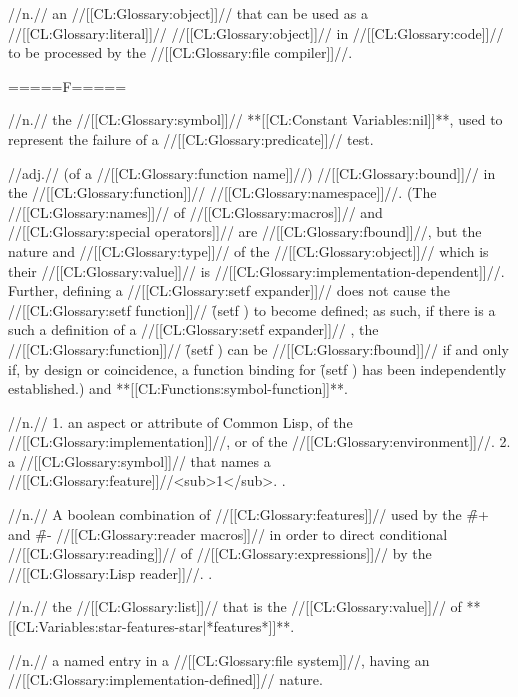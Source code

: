  //n.// an //[[CL:Glossary:object]]// that can be used as a //[[CL:Glossary:literal]]// //[[CL:Glossary:object]]// in //[[CL:Glossary:code]]// to be processed by the //[[CL:Glossary:file compiler]]//. 

=====F=====
 
 //n.// the //[[CL:Glossary:symbol]]// **[[CL:Constant Variables:nil]]**, used to represent the failure of a //[[CL:Glossary:predicate]]// test.

 //adj.// (of a //[[CL:Glossary:function name]]//) //[[CL:Glossary:bound]]// in the //[[CL:Glossary:function]]// //[[CL:Glossary:namespace]]//. (The //[[CL:Glossary:names]]// of //[[CL:Glossary:macros]]// and //[[CL:Glossary:special operators]]// are //[[CL:Glossary:fbound]]//, but the nature and //[[CL:Glossary:type]]// of the //[[CL:Glossary:object]]// which is their //[[CL:Glossary:value]]// is //[[CL:Glossary:implementation-dependent]]//.
 Further, defining a //[[CL:Glossary:setf expander]]//  does not cause the //[[CL:Glossary:setf function]]// \f{(setf )} to become defined; as such, if there is a such a definition of a //[[CL:Glossary:setf expander]]// , the //[[CL:Glossary:function]]// \f{(setf )} can be //[[CL:Glossary:fbound]]// if and only if, by design or coincidence, a function binding for \f{(setf )} has been independently established.)  and **[[CL:Functions:symbol-function]]**.

 //n.// 1. an aspect or attribute of Common Lisp, of the //[[CL:Glossary:implementation]]//, or of the //[[CL:Glossary:environment]]//. 2. a //[[CL:Glossary:symbol]]// that names a //[[CL:Glossary:feature]]//<sub>1</sub>. \Seesection\Features. 

 //n.// A boolean combination of //[[CL:Glossary:features]]// used by the \f{\#+} and \f{\#-} //[[CL:Glossary:reader macros]]// in order to direct conditional //[[CL:Glossary:reading]]// of //[[CL:Glossary:expressions]]// by the //[[CL:Glossary:Lisp reader]]//. \Seesection\FeatureExpressions.

 //n.// the //[[CL:Glossary:list]]// that is the //[[CL:Glossary:value]]// of **[[CL:Variables:star-features-star|*features*]]**.

 //n.// a named entry in a //[[CL:Glossary:file system]]//, having an //[[CL:Glossary:implementation-defined]]// nature.

